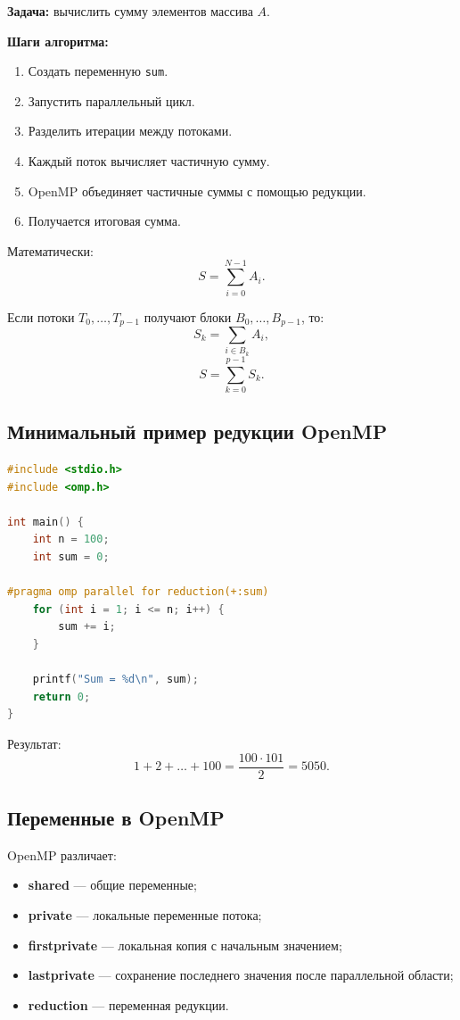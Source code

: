 \documentclass[12pt,a4paper]{article}
\begin{document}
\textbf{Задача:} вычислить сумму элементов массива $A$.

\textbf{Шаги алгоритма:}
\begin{enumerate}
    \item Создать переменную \texttt{sum}.
    \item Запустить параллельный цикл.
    \item Разделить итерации между потоками.
    \item Каждый поток вычисляет частичную сумму.
    \item OpenMP объединяет частичные суммы с помощью редукции.
    \item Получается итоговая сумма.
\end{enumerate}

Математически:
\[
S = \sum_{i=0}^{N-1} A_i.
\]

Если потоки $T_0,\ldots,T_{p-1}$ получают блоки $B_0,\ldots,B_{p-1}$, то:
\[
S_k = \sum_{i \in B_k} A_i,
\]
\[
S = \sum_{k=0}^{p-1} S_k.
\]

\subsection{Минимальный пример редукции OpenMP}

\begin{lstlisting}[language=C]
#include <stdio.h>
#include <omp.h>

int main() {
    int n = 100;
    int sum = 0;

#pragma omp parallel for reduction(+:sum)
    for (int i = 1; i <= n; i++) {
        sum += i;
    }

    printf("Sum = %d\n", sum);
    return 0;
}
\end{lstlisting}

Результат:
\[
1+2+\ldots+100 = \frac{100 \cdot 101}{2}=5050.
\]

\subsection{Переменные в OpenMP}

OpenMP различает:
\begin{itemize}
    \item \textbf{shared} --- общие переменные;
    \item \textbf{private} --- локальные переменные потока;
    \item \textbf{firstprivate} --- локальная копия с начальным значением;
    \item \textbf{lastprivate} --- сохранение последнего значения после параллельной области;
    \item \textbf{reduction} --- переменная редукции.
\end{itemize}
\end{document}
